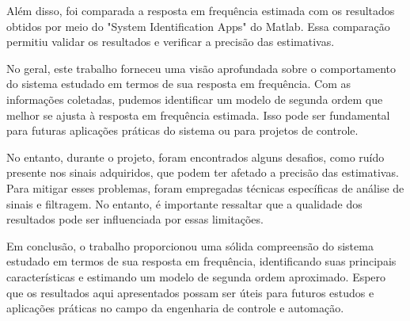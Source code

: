\documentclass[10pt]{article}
\begin{document}
\quad Além disso, foi comparada a resposta em frequência estimada com os resultados obtidos por meio do "System Identification Apps" do Matlab.
Essa comparação permitiu validar os resultados e verificar a precisão das estimativas.

\quad No geral, este trabalho forneceu uma visão aprofundada sobre o comportamento do sistema estudado em termos de sua resposta em frequência.
Com as informações coletadas, pudemos identificar um modelo de segunda ordem que melhor se ajusta à resposta em frequência estimada.
Isso pode ser fundamental para futuras aplicações práticas do sistema ou para projetos de controle.

\quad No entanto, durante o projeto, foram encontrados alguns desafios, como ruído presente nos sinais adquiridos, que podem ter afetado a precisão das estimativas. Para mitigar esses problemas, foram empregadas técnicas específicas de análise de sinais e filtragem.
No entanto, é importante ressaltar que a qualidade dos resultados pode ser influenciada por essas limitações.

\quad Em conclusão, o trabalho proporcionou uma sólida compreensão do sistema estudado em termos de sua resposta em frequência,
identificando suas principais características e estimando um modelo de segunda ordem aproximado.
Espero que os resultados aqui apresentados possam ser úteis para futuros estudos e aplicações práticas no campo da engenharia de controle e automação.

\newpage
\end{document}
